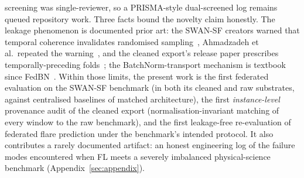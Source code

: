 screening was single-reviewer, so a PRISMA-style dual-screened log
remains queued repository work. Three facts bound the novelty claim honestly. The leakage
phenomenon is documented prior art: the SWAN-SF creators warned that
temporal coherence invalidates randomised
sampling~\cite{angryk2019}, Ahmadzadeh et al.\ repeated the
warning~\cite{ahmadzadeh2021}, and the cleaned export's release paper
prescribes temporally-preceding folds~\cite{eskandari2024}; the
BatchNorm-transport mechanism is textbook since
FedBN~\cite{li2021fedbn}. Within those limits, the present work is
the first federated evaluation on the SWAN-SF benchmark (in both
its cleaned and raw substrates, against centralised baselines of
matched architecture), the first \emph{instance-level} provenance
audit of the cleaned export (normalisation-invariant matching of
every window to the raw benchmark), and the first leakage-free
re-evaluation of federated flare prediction under the benchmark's
intended protocol. It also contributes a rarely documented artifact:
an honest engineering log of the failure modes encountered when FL
meets a severely imbalanced physical-science benchmark
(Appendix~\ref{sec:appendix}).
